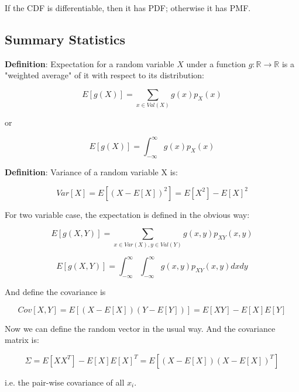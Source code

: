 \documentclass{article}
\begin{document}
If the CDF is differentiable, then it has PDF; otherwise it has PMF.

\subsection{Summary Statistics}

\textbf{Definition}: Expectation for a random variable $X$ under a function
$g:\mathbb{R}\to \mathbb{R}$
 is a "weighted average" of 
it with respect to its distribution:

$$
E[g(X)] = \sum_{x\in Val(X)} g(x)p_X(x)
$$

or


$$
E[g(X)] = \int_{-\infty}^\infty g(x)p_X(x)
$$

\textbf{Definition}: Variance of a random variable X is:

$$
Var[X] = E[(X-E[X])^2]=E[X^2]-E[X]^2
$$


For two variable case, the expectation is defined in the obvious way:

$$
E[g(X,Y)] = \sum_{x\in Var(X),y\in Val(Y)}g(x,y)p_{XY}(x,y)
$$

$$
E[g(X,Y)] = \int_{-\infty}^\infty\int_{-\infty}^\infty g(x,y)p_{XY}(x,y)dxdy
$$

And define the covariance is 

$$
Cov[X,Y] = E[(X-E[X])(Y-E[Y])] = E[XY]-E[X]E[Y]
$$

Now we can define the random vector in the usual way. And the covariance matrix is:

$$
\Sigma = E[XX^T]-E[X]E[X]^T= E[(X-E[X])(X-E[X])^T]
$$

i.e. the pair-wise covariance of all $x_i$.
\end{document}

